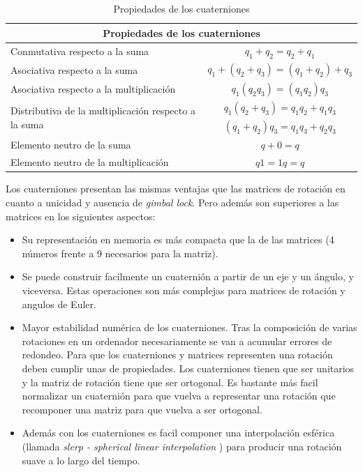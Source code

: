 \documentclass[10pt, a4paper]{report}
\begin{document}
\begin{table}[h]
\center
\begin{tabular}{|l|c|}

\hline
\multicolumn{2}{|c|}{\textbf{Propiedades de los cuaterniones}}\\
\hline
Conmutativa respecto a la suma & $ q_1 + q_2 = q_2 + q_1 $ \\
\hline
Asociativa respecto a la suma & $ q_1 + (q_2 + q_3) = (q_1 + q_2) + q_3 $ \\
\hline
Asociativa respecto a la multiplicación & $ q_1(q_2q_3) = (q_1q_2)q_3 $ \\
\hline
\multirow{2}{*}{Distributiva de la multiplicación respecto a la suma} & $ q_1(q_2 + q_3) = q_1q_2 + q_1q_3 $ \\
\cline{2-2}
 & $ (q_1 + q_2)q_3 = q_1q_3 + q_2q_3 $ \\
\hline
Elemento neutro de la suma & $ q + 0 = q $ \\
\hline
Elemento neutro de la multiplicación & $ q1 = 1q = q $ \\
\hline

\end{tabular}

\caption{Propiedades de los cuaterniones}
\label{tab:propiedades_cuaterniones}

\end{table}

Los cuaterniones presentan las mismas ventajas que las matrices de rotación en cuanto a unicidad y ausencia de \textit{gimbal lock}. Pero además son superiores a las matrices en los siguientes aspectos:

\begin{itemize}

\item Su representación en memoria es más compacta que la de las matrices (4 números frente a 9 necesarios para la matriz).

\item Se puede construir facilmente un cuaternión a partir de un eje y un ángulo, y viceversa. Estas operaciones son más complejas para matrices de rotación y angulos de Euler.

\item Mayor estabilidad numérica de los cuaterniones. Tras la composición de varias rotaciones en un ordenador necesariamente se van a acumular errores de redondeo. Para que los cuaterniones y matrices representen una rotación deben cumplir unas de propiedades. Los cuaterniones tienen que ser unitarios y la matriz de rotación tiene que ser ortogonal. Es bastante más facil normalizar un cuaternión para que vuelva a representar una rotación que recomponer una matriz para que vuelva a ser ortogonal.

\item Además con los cuaterniones es facil componer una interpolación esférica (llamada \textit{slerp - spherical linear interpolation} ) para producir una rotación suave a lo largo del tiempo.

\end{itemize}
\end{document}
